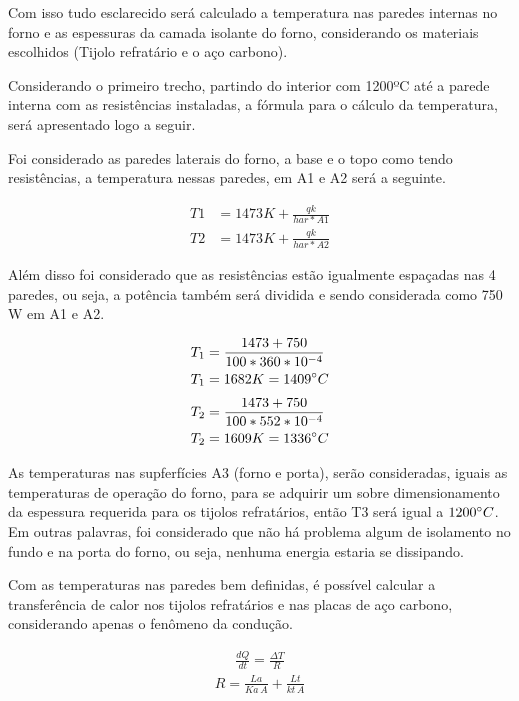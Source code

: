 Com isso tudo esclarecido será calculado a temperatura nas paredes internas no forno e as espessuras da camada isolante do forno, considerando os materiais escolhidos (Tijolo refratário e o aço carbono).

Considerando o primeiro trecho, partindo do interior com 1200ºC até a parede interna com as resistências instaladas, a fórmula para o cálculo da temperatura, será apresentado logo a seguir.

Foi considerado as paredes laterais do forno, a base e o topo como tendo resistências, a temperatura nessas paredes, em A1 e A2 será a seguinte.

\begin{align}
	T1 &= 1473K + \frac{qk}{har*A1} \\
	T2 &= 1473K + \frac{qk}{har*A2}
\end{align}

Além disso foi considerado que as resistências estão igualmente espaçadas nas 4 paredes, ou seja, a potência também será dividida e sendo considerada como 750 W em A1 e A2.

\begin{align}
	T_1 &= \frac{1473 + 750} {100*360*10^{-4}} \\
	T_1 &= 1682K = 1409 \degree C
    \nonumber
\end{align}
\begin{align}
    T_2 &= \frac{1473 + 750} {100*552*10^{-4}} \\
	T_2 &= 1609K = 1336 \degree C
    \nonumber
\end{align}

As temperaturas nas supferfícies A3 (forno e porta), serão consideradas, iguais as temperaturas de operação do forno, para se adquirir um sobre dimensionamento da espessura requerida para os tijolos refratários, então T3 será igual a $1200 \degree C$. Em outras palavras, foi considerado que não há problema algum de isolamento no fundo e na porta do forno, ou seja, nenhuma energia estaria se dissipando.

Com as temperaturas nas paredes bem definidas, é possível calcular a transferência de calor nos tijolos refratários e nas placas de aço carbono, considerando apenas o fenômeno da condução.

\begin{align}
	\frac{dQ}{dt} = \frac{\Delta T}{R}
\end{align}
\begin{align}
	R = \frac{La}{Ka\, A} + \frac{Lt}{kt\, A}
\end{align}


